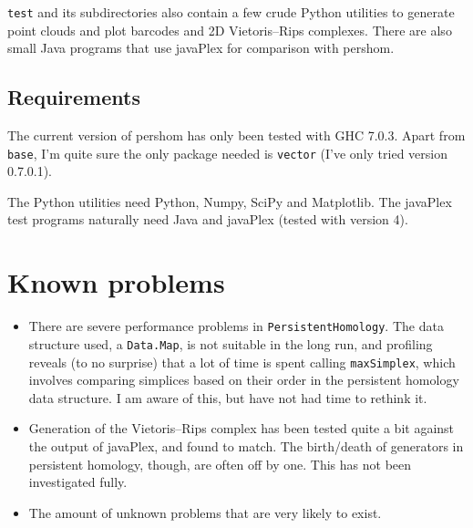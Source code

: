\documentclass[a4paper,10pt]{article}
\begin{document}
\texttt{test} and its subdirectories also contain a few crude Python
utilities to generate point clouds and plot barcodes and 2D
Vietoris--Rips complexes. There are also small Java programs that use
javaPlex for comparison with pershom.

\subsection{Requirements}
The current version of pershom has only been tested with GHC
7.0.3. Apart from \texttt{base}, I'm quite sure the only package
needed is \texttt{vector} (I've only tried version 0.7.0.1).

The Python utilities need Python, Numpy, SciPy and Matplotlib. The
javaPlex test programs naturally need Java and javaPlex (tested with
version 4).

\section{Known problems}
\begin{itemize}
  \item There are severe performance problems in
    \texttt{PersistentHomology}. The data structure used, a
    \texttt{Data.Map}, is not suitable in the long run, and profiling
    reveals (to no surprise) that a lot of time is spent calling
    \texttt{maxSimplex}, which involves comparing simplices based on
    their order in the persistent homology data structure. I am aware
    of this, but have not had time to rethink it.
  \item Generation of the Vietoris--Rips complex has been tested quite
    a bit against the output of javaPlex, and found to match. The
    birth/death of generators in persistent homology, though, are
    often off by one. This has not been investigated fully.
  \item The amount of unknown problems that are very likely to exist.
\end{itemize}
\end{document}
